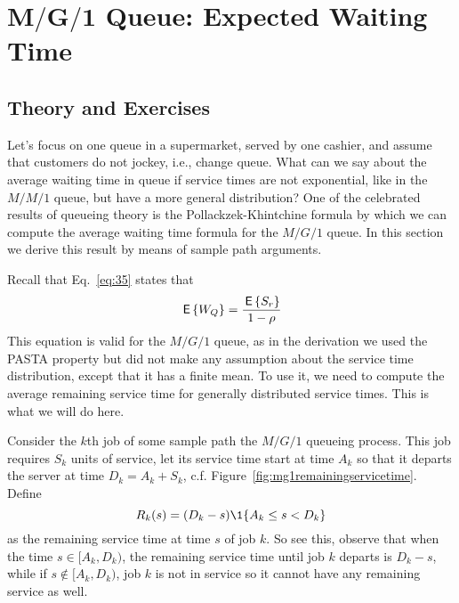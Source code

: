 \section
[$M/G/1$ Queue: Expected Waiting Time]
{$\mathbf{M/G/1}$ Queue: Expected Waiting Time}
\label{sec:mg1}


\subsection*{Theory and Exercises}



Let's focus on one queue in a supermarket, served by one cashier, and
assume that customers do not jockey, i.e., change queue. What can we
say about the average waiting time in queue if service times are not
exponential, like in the $M/M/1$ queue, but have a more general
distribution? One of the celebrated results of queueing theory is the
Pollackzek-Khintchine formula by which we can compute the average
waiting time formula for the $M/G/1$ queue. In this section we derive
this result by means of sample path arguments.

Recall that Eq.~\eqref{eq:35} states that
\begin{equation*}
  \,\mathsf{E}\left\{W_Q\right\} = \frac{\,\mathsf{E}\left\{S_r\right\}}{1-\rho}
\end{equation*}
This equation is valid for the $M/G/1$ queue, as in the derivation we
used the PASTA property but did not make any assumption about the
service time distribution, except that it has a finite mean. To use
it, we need to compute the average remaining service time for
generally distributed service times. This is what we will do here.

Consider the $k$th job of some sample path the $M/G/1$ queueing
process. This job requires $S_k$ units of service, let its service
time start at time $A_k$ so that it departs the server at time
$D_k=A_k + S_k$, c.f. Figure~\ref{fig:mg1remainingservicetime}. Define
\begin{equation*}
R_k(s) = (D_k-s)\1{A_k \leq s < D_k}
\end{equation*}
as the remaining service time at time $s$ of job $k$. So see this,
observe that when the time $s\in [A_k, D_k)$, the remaining service
time until job $k$ departs is $D_k-s $, while if
$s\not \in [A_k, D_k)$, job $k$ is not in service so it cannot have
any remaining service as well.

